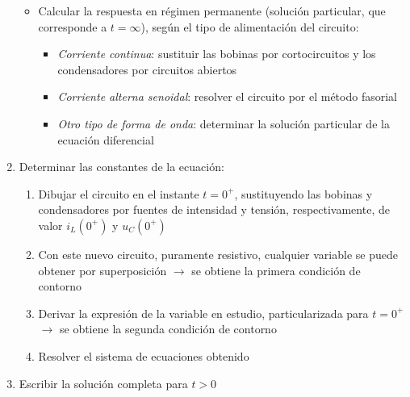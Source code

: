 \begin{enumerate}
\begin{itemize}
        \item Calcular la respuesta en régimen permanente (solución particular, que corresponde a $t=\infty$), según el tipo de alimentación del circuito: 
        \begin{itemize}
	        \item \textit{Corriente continua}: sustituir las bobinas por cortocircuitos y los condensadores por circuitos abiertos
	        \item \textit{Corriente alterna senoidal}: resolver el circuito por el método fasorial
	        \item \textit{Otro tipo de forma de onda}: determinar la solución particular de la ecuación diferencial
	    \end{itemize}
        \end{itemize}
        \item Determinar las constantes de la ecuación:
	\begin{enumerate}
	    \item Dibujar el circuito en el instante $t=0^+$, sustituyendo las bobinas y condensadores por fuentes de intensidad y tensión, respectivamente, de valor $i_L(0^+)$ y $u_C(0^+)$
	    \item Con este nuevo circuito, puramente resistivo, cualquier variable se puede obtener por superposición $\rightarrow$ se obtiene la primera condición de contorno
	    \item Derivar la expresión de la variable en estudio, particularizada para $t=0^+$ $\rightarrow$ se obtiene la segunda condición de contorno
	    \item Resolver el sistema de ecuaciones obtenido
	\end{enumerate}
    \item Escribir la solución completa para $t>0$
	\end{enumerate}
	

